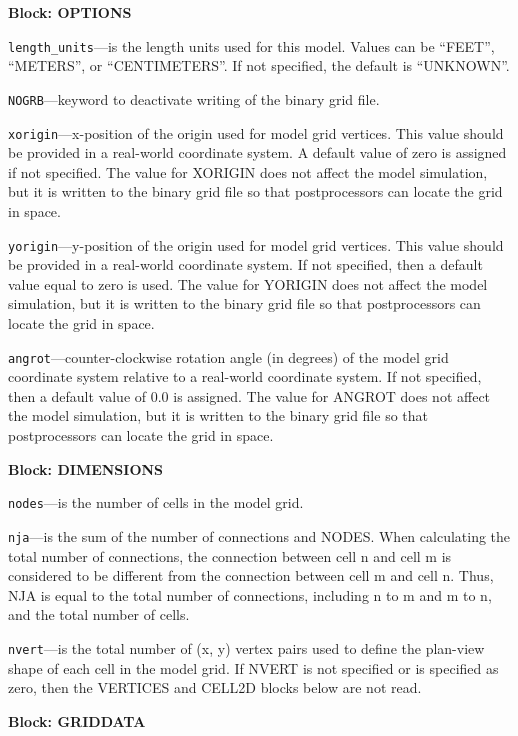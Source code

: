 
\item \textbf{Block: OPTIONS}

\begin{description}
\item \texttt{length\_units}---is the length units used for this model.  Values can be ``FEET'', ``METERS'', or ``CENTIMETERS''.  If not specified, the default is ``UNKNOWN''.

\item \texttt{NOGRB}---keyword to deactivate writing of the binary grid file.

\item \texttt{xorigin}---x-position of the origin used for model grid vertices.  This value should be provided in a real-world coordinate system.  A default value of zero is assigned if not specified.  The value for XORIGIN does not affect the model simulation, but it is written to the binary grid file so that postprocessors can locate the grid in space.

\item \texttt{yorigin}---y-position of the origin used for model grid vertices.  This value should be provided in a real-world coordinate system.  If not specified, then a default value equal to zero is used.  The value for YORIGIN does not affect the model simulation, but it is written to the binary grid file so that postprocessors can locate the grid in space.

\item \texttt{angrot}---counter-clockwise rotation angle (in degrees) of the model grid coordinate system relative to a real-world coordinate system.  If not specified, then a default value of 0.0 is assigned.  The value for ANGROT does not affect the model simulation, but it is written to the binary grid file so that postprocessors can locate the grid in space.

\end{description}
\item \textbf{Block: DIMENSIONS}

\begin{description}
\item \texttt{nodes}---is the number of cells in the model grid.

\item \texttt{nja}---is the sum of the number of connections and NODES.  When calculating the total number of connections, the connection between cell n and cell m is considered to be different from the connection between cell m and cell n.  Thus, NJA is equal to the total number of connections, including n to m and m to n, and the total number of cells.

\item \texttt{nvert}---is the total number of (x, y) vertex pairs used to define the plan-view shape of each cell in the model grid.  If NVERT is not specified or is specified as zero, then the VERTICES and CELL2D blocks below are not read.

\end{description}
\item \textbf{Block: GRIDDATA}

